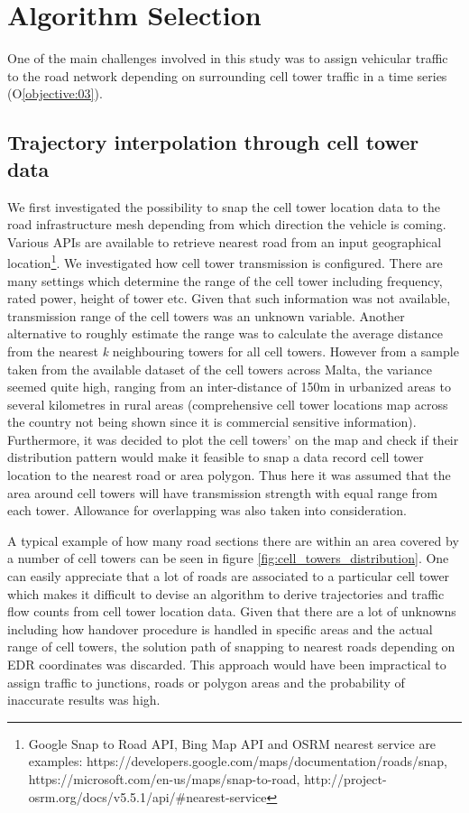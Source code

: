 \documentclass[12pt, a4paper]{report}
\theoremstyle{definition}
\theoremstyle{definition}%
\theoremstyle{definition}%
\theoremstyle{definition}%
\theoremstyle{definition}%
\theoremstyle{definition}%
\begin{document}
\section{Algorithm Selection} \label{section:methodology:algorithm_selection}

One of the main challenges involved in this study was to assign vehicular traffic to the road network depending on surrounding cell tower traffic in a time series (O\ref{objective:03}).

\subsection{Trajectory interpolation through cell tower data} \label{subsection:methodology:trajectory_interpolation}
We first investigated the possibility to snap the cell tower location data to the road infrastructure mesh depending from which direction the vehicle is coming. Various APIs are available to retrieve nearest road from an input geographical location\footnote{Google Snap to Road API, Bing Map API and OSRM nearest service are examples: https://developers.google.com/maps/documentation/roads/snap, https://microsoft.com/en-us/maps/snap-to-road, http://project-osrm.org/docs/v5.5.1/api/\#nearest-service}. We investigated how cell tower transmission is configured. There are many settings which determine the range of the cell tower including frequency, rated power, height of tower etc. Given that such information was not available, transmission range of the cell towers was an unknown variable. Another alternative to roughly estimate the range was to calculate the average distance from the nearest \textit{k} neighbouring towers for all cell towers. However from a sample taken from the available dataset of the cell towers across Malta, the variance seemed quite high, ranging from an inter-distance of 150m in urbanized areas to several kilometres in rural areas (comprehensive cell tower locations map across the country not being shown since it is  commercial sensitive information). Furthermore, it was decided to plot the cell towers' on the map and check if their distribution pattern would make it feasible to snap a data record cell tower location to the nearest road or area polygon. Thus here it was assumed that the area around cell towers will have transmission strength with equal range from each tower. Allowance for overlapping was also taken into consideration. 

A typical example of how many road sections there are within an area covered by a number of cell towers can be seen in figure \ref{fig:cell_towers_distribution}. One can easily appreciate that a lot of roads are associated to a particular cell tower which makes it difficult to devise an algorithm to derive trajectories and traffic flow counts from cell tower location data. Given that there are a lot of unknowns including how handover procedure is handled in specific areas and the actual range of cell towers, the solution path of snapping to nearest roads depending on EDR coordinates was discarded. This approach would have been impractical to assign traffic to junctions, roads or polygon areas and the probability of inaccurate results was high.
\end{document}
